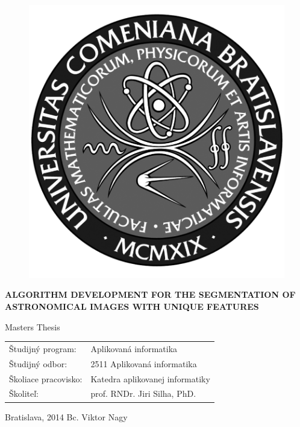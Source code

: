 \documentclass[12pt, a4paper, oneside]{book}
\newcommand\mftitle{Algorithm development for the segmentation of astronomical images with unique features}
\newcommand\mfthesistype{Masters Thesis}
\newcommand\mfauthor{Bc. Viktor Nagy}
\newcommand\mfadvisor{prof. RNDr. Jiri Silha, PhD.}
\newcommand\mfplacedate{Bratislava, 2014}
\begin{document}
\vfill
\begin{figure}[!hbt]
\begin{center}
\includegraphics{images/logo_fmph_dark}
\label{img:logo_dark}
\end{center}
\end{figure}
\begin{center}
\begin{minipage}{0.8\textwidth}
\centerline{\textbf{\Large\MakeUppercase{\mftitle}}}
\smallskip
\centerline{\mfthesistype}
\end{minipage}
\end{center}
\vfill
\begin{tabular}{l l}
Študijný program: & Aplikovaná informatika\\
Študijný odbor: & 2511 Aplikovaná informatika\\
Školiace pracovisko: & Katedra aplikovanej informatiky\\
Školiteľ: & \mfadvisor
\end{tabular}
\vfill
\noindent
\mfplacedate \hfill
\mfauthor
\eject 

\end{document}
